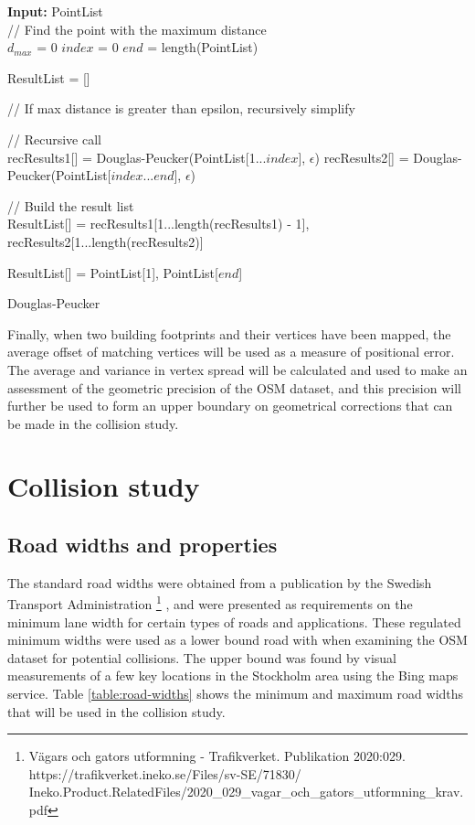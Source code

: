\documentclass{kththesis}
\begin{document}
\begin{algorithm}[H]
\SetAlgoLined
{}
    \textbf{Input:} PointList\\
    // Find the point with the maximum distance\\
    $d_{max}$ = 0\;
    $index$ = 0\;
    $end$ = length(PointList)\;
    

    ResultList = []\;
    
    // If max distance is greater than epsilon, recursively simplify\\
     {
        // Recursive call\\
        recResults1[] = Douglas-Peucker(PointList[1...$index$], $\epsilon$)\;
        recResults2[] = Douglas-Peucker(PointList[$index$...$end$], $\epsilon$)\;

        // Build the result list\\
        ResultList[] = {recResults1[1...length(recResults1) - 1], recResults2[1...length(recResults2)]}\;
    }{
        ResultList[] = {PointList[1], PointList[$end$]}\;
    }
    \;

    \caption{Douglas-Peucker}
\end{algorithm}

Finally, when two building footprints and their vertices have been mapped, the average offset of matching vertices will be used as a measure of positional error.
The average and variance in vertex spread will be calculated and used to make an assessment of the geometric precision of the OSM dataset, and this precision will further be used to form an upper boundary on geometrical corrections that can be made in the collision study.

\section{Collision study}

\subsection{Road widths and properties}

The standard road widths were obtained from a publication by the Swedish Transport Administration
\footnote{Vägars och gators utformning - Trafikverket. Publikation 2020:029. https://trafikverket.ineko.se/Files/sv-SE/71830/\\Ineko.Product.RelatedFiles/2020\_029\_vagar\_och\_gators\_utformning\_krav.pdf}
, and were presented as requirements on the minimum lane width for certain types of roads and applications.
These regulated minimum widths were used as a lower bound road with when examining the OSM dataset for potential collisions.
The upper bound was found by visual measurements of a few key locations in the Stockholm area using the Bing maps service.
Table \ref{table:road-widths} shows the minimum and maximum road widths that will be used in the collision study.
\end{document}
